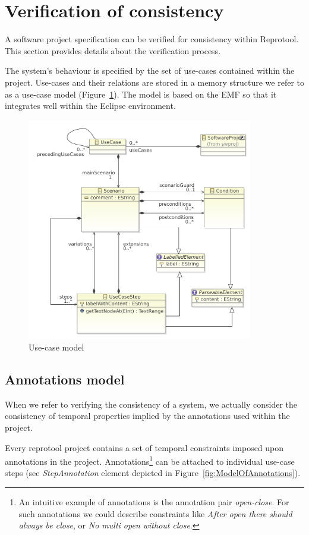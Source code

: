 \section{Verification of consistency}

A software project specification can be verified for consistency within Reprotool.
This section provides details about the verification process.

The system's behaviour is specified by the set of use-cases contained within the project.
Use-cases and their relations are stored in a memory structure we refer to as a use-case model (Figure~\ref{fig:ReprotoolUCModel}).
The model is based on the \ac{EMF} so that it integrates well within the Eclipse environment.

\begin{figure}[ht]
  \centering
  \includegraphics[width=280pt]{images/ReprotoolUCModel}
  \caption{Use-case model}
  \label{fig:ReprotoolUCModel}
\end{figure}

\subsection{Annotations model}

When we refer to verifying the consistency of a system, we actually consider the consistency of temporal properties implied by the annotations used within the project.

Every reprotool project contains a set of temporal constraints imposed upon annotations in the project.
Annotations\footnote{An intuitive example of annotations is the annotation pair \emph{open-close}. For such annotations we could describe constraints like \emph{After open there should always be close}, or \emph{No multi open without close}.} can be attached to individual use-case steps (see \emph{StepAnnotation} element depicted in Figure~\ref{fig:ModelOfAnnotations}).


